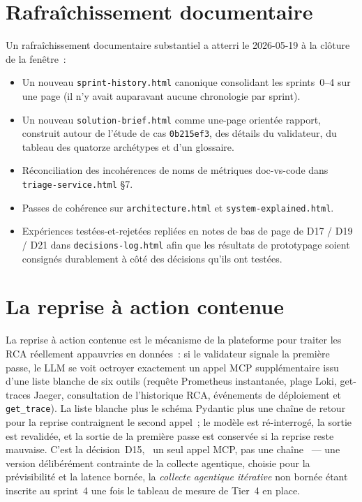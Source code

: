 \documentclass[11pt,a4paper,oneside]{report}
\begin{document}
\section{Rafraîchissement documentaire}

Un rafraîchissement documentaire substantiel a atterri le
2026-05-19 à la clôture de la fenêtre~:

\begin{itemize}
  \item Un nouveau \texttt{sprint-history.html} canonique consolidant
        les sprints~0--4 sur une page (il n'y avait auparavant
        aucune chronologie par sprint).
  \item Un nouveau \texttt{solution-brief.html} comme une-page
        orientée rapport, construit autour de l'étude de cas
        \texttt{0b215ef3}, des détails du validateur, du tableau
        des quatorze archétypes et d'un glossaire.
  \item Réconciliation des incohérences de noms de métriques
        doc-vs-code dans \texttt{triage-service.html} \S7.
  \item Passes de cohérence sur \texttt{architecture.html} et
        \texttt{system-explained.html}.
  \item Expériences testées-et-rejetées repliées en notes de bas de
        page de D17 / D19 / D21 dans \texttt{decisions-log.html}
        afin que les résultats de prototypage soient consignés
        durablement à côté des décisions qu'ils ont testées.
\end{itemize}

\section{La reprise à action contenue}
\label{sec:bounded-agency}

La reprise à action contenue est le mécanisme de la plateforme pour
traiter les RCA réellement appauvries en données~: si le validateur
signale la première passe, le LLM se voit octroyer exactement un
appel MCP supplémentaire issu d'une liste blanche de six outils
(requête Prometheus instantanée, plage Loki, get-traces Jaeger,
consultation de l'historique RCA, événements de déploiement et
\texttt{get\_trace}). La liste blanche plus le schéma Pydantic plus
une chaîne de retour pour la reprise contraignent le second appel~;
le modèle est ré-interrogé, la sortie est revalidée, et la sortie
de la première passe est conservée si la reprise reste mauvaise.
C'est la décision~D15, \og~un seul appel MCP, pas une chaîne~\fg{}
--- une version délibérément contrainte de la collecte agentique,
choisie pour la prévisibilité et la latence bornée, la
\emph{collecte agentique itérative} non bornée étant inscrite au
sprint~4 une fois le tableau de mesure de Tier~4 en place.
\end{document}

